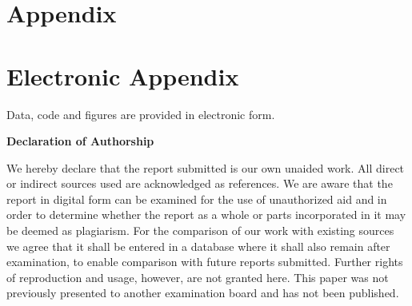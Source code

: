 \documentclass[12pt]{article}
\begin{document}
\setcounter{page}{5}

\appendix

\section{Appendix}
\label{app}
% 
\newpage

\section{Electronic Appendix}
\label{el_app}

Data, code and figures are provided in electronic form.

\newpage
    

\RaggedRight

\newpage


\Large
\noindent
\textbf{Declaration of Authorship} 
\vspace{0.5cm}
\noindent
\normalsize

We hereby declare that the report submitted is our own unaided work. All direct 
or indirect sources used are acknowledged as references. We are aware that the 
report in digital form can be examined for the use of unauthorized aid and in 
order to determine whether the report as a whole or parts incorporated in it may 
be deemed as plagiarism. For the comparison of our work with existing sources we 
agree that it shall be entered in a database where it shall also remain after 
examination, to enable comparison with future reports submitted. Further rights 
of reproduction and usage, however, are not granted here. This paper was not 
previously presented to another examination board and has not been published. 

\end{document}
